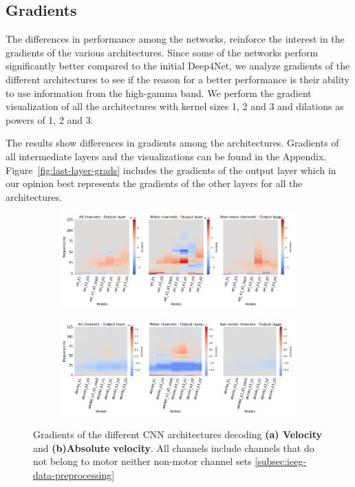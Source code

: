 \subsection{Gradients}\label{subsec:gradients}
The differences in performance among the networks, reinforce the interest in the gradients of the various architectures.
Since some of the networks perform significantly better compared to the initial Deep4Net, we analyze gradients of the different architectures to see if the reason for a better performance is their ability to use information from the high-gamma band.
We perform the gradient visualization of all the architectures with kernel sizes 1, 2 and 3 and dilations as powers of 1, 2 and 3.

The results show differences in gradients among the architectures.
Gradients of all intermediate layers and the visualizations can be found in the Appendix.
Figure~\ref{fig:last-layer-grads} includes the gradients of the output layer which in our opinion best represents the gradients of the other layers for all the architectures.

\begin{figure}[!htpb]
\centering
\begin{subfigure}[b]{\textwidth}
   \includegraphics[width=1\linewidth]{img/ch4/vel-last-layer-grads}
   \caption{}
\end{subfigure}\label{fig:absVel-last-layer-grads}

\begin{subfigure}[b]{\textwidth}
   \includegraphics[width=1\linewidth]{img/ch4/absVel-last-layer-grads}
   \caption{}
\end{subfigure}\label{fig:vel-last-layer-grads}
\caption[]{Gradients of the different CNN architectures decoding \textbf{(a) Velocity} and \textbf{(b)Absolute velocity}. All channels include channels that do not belong to motor neither non-motor channel sets \ref{subsec:ieeg-data-preprocessing}}
\end{figure}\label{fig:last-layer-grads}

